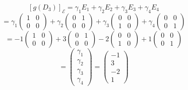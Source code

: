 \documentclass[a4paper]{article}
\theoremstyle{break}
\theoremstyle{break}
\theoremstyle{break}
\theoremstyle{break}
\begin{document}
\begin{enumerate}
        \[
          [g(D_3)]_{\mathcal{E}} = \gamma_1 E_1 + \gamma_2 E_2 + \gamma_3 E_3 + \gamma_4 E_4
        \]
        \[
        = \gamma_1 \begin{pmatrix} 
          1 & 0\\
          0 & 0
        \end{pmatrix}
        + \gamma_2 \begin{pmatrix} 
          0 & 1\\
          0 & 0
        \end{pmatrix}
        + \gamma_3 \begin{pmatrix} 
          0 & 0\\
          1 & 0
        \end{pmatrix}
        + \gamma_4 \begin{pmatrix} 
          0 & 0\\
          0 & 1
        \end{pmatrix}
        \]
        \[
          = -1 \begin{pmatrix} 
            1 & 0\\
            0 & 0
          \end{pmatrix} 
          +3 \begin{pmatrix} 
            0 & 1\\
            0 & 0
          \end{pmatrix}
          -2 \begin{pmatrix} 
            0 & 0\\
            1 & 0
          \end{pmatrix} 
          +1 \begin{pmatrix} 
            0 & 0\\
            0 & 1
          \end{pmatrix}
        \]
        \[
        = \begin{pmatrix} 
          \gamma_1\\
          \gamma_2\\
          \gamma_3\\
          \gamma_4
        \end{pmatrix}
        = \begin{pmatrix} 
          -1\\
          3\\
          -2\\
          1
        \end{pmatrix}
        \]


\end{enumerate}
\end{document}
